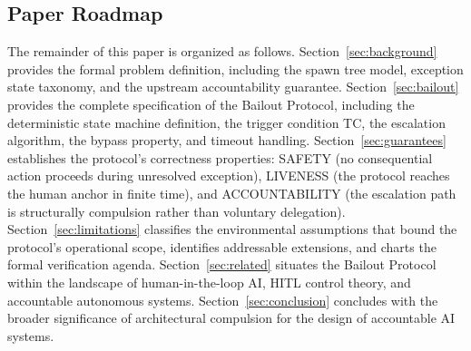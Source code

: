 \subsection{Paper Roadmap}

The remainder of this paper is organized as follows. Section~\ref{sec:background} provides the formal problem definition, including the spawn tree model, exception state taxonomy, and the upstream accountability guarantee. Section~\ref{sec:bailout} provides the complete specification of the Bailout Protocol, including the deterministic state machine definition, the trigger condition TC, the escalation algorithm, the bypass property, and timeout handling. Section~\ref{sec:guarantees} establishes the protocol's correctness properties: SAFETY (no consequential action proceeds during unresolved exception), LIVENESS (the protocol reaches the human anchor in finite time), and ACCOUNTABILITY (the escalation path is structurally compulsion rather than voluntary delegation). Section~\ref{sec:limitations} classifies the environmental assumptions that bound the protocol's operational scope, identifies addressable extensions, and charts the formal verification agenda. Section~\ref{sec:related} situates the Bailout Protocol within the landscape of human-in-the-loop AI, HITL control theory, and accountable autonomous systems. Section~\ref{sec:conclusion} concludes with the broader significance of architectural compulsion for the design of accountable AI systems.